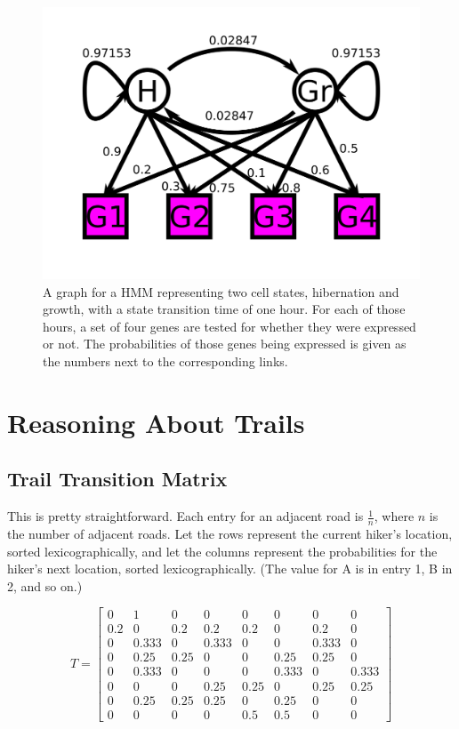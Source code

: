 \documentclass{article}
\begin{document}
\begin{figure}[!ht]
	\centering
	\includegraphics[width=120mm]{figs/cell-gene-expression.png}
	\caption{A graph for a HMM representing two cell states, hibernation and 
        growth, with a state transition time of one hour. For each of those 
        hours, a set of four genes are tested for whether they were expressed or 
        not. The probabilities of those genes being expressed is given as the 
        numbers next to the corresponding links.}
\end{figure}

\section{Reasoning About Trails}

\subsection{Trail Transition Matrix}

This is pretty straightforward. Each entry for an adjacent road is $\frac{1}{n}$, 
where $n$ is the number of adjacent roads. Let the rows represent the current 
hiker's location, sorted lexicographically, and let the columns represent the 
probabilities for the hiker's next location, sorted lexicographically. (The 
value for A is in entry 1, B in 2, and so on.)

$$
T = \begin{bmatrix}
0   & 1     & 0    & 0     & 0    & 0     & 0     & 0 \\
0.2 & 0     & 0.2  & 0.2   & 0.2  & 0     & 0.2   & 0 \\
0   & 0.333 & 0    & 0.333 & 0    & 0     & 0.333 & 0 \\
0   & 0.25  & 0.25 & 0     & 0    & 0.25  & 0.25  & 0 \\
0   & 0.333 & 0    & 0     & 0    & 0.333 & 0     & 0.333 \\
0   & 0     & 0    & 0.25  & 0.25 & 0     & 0.25  & 0.25 \\
0   & 0.25  & 0.25 & 0.25  & 0    & 0.25  & 0     & 0 \\
0   & 0     & 0    & 0     & 0.5  & 0.5   & 0     & 0
\end{bmatrix}
$$
\end{document}
